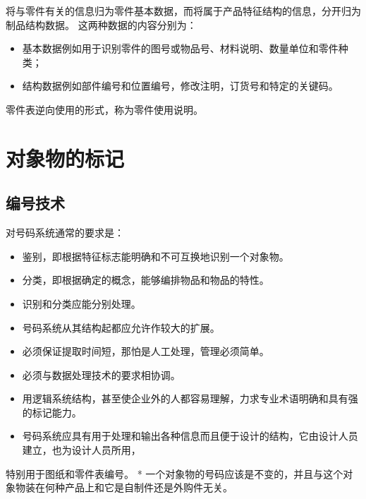 \documentclass[letterpaper,10pt,english]{sphinxmanual}
\begin{document}
将与零件有关的信息归为零件基本数据，而将属于产品特征结构的信息，分开归为制品结构数据。
这两种数据的内容分别为：
\begin{itemize}
\item {} 
基本数据例如用于识别零件的图号或物品号、材料说明、数量单位和零件种类；

\item {} 
结构数据例如部件编号和位置编号，修改注明，订货号和特定的关键码。

\end{itemize}

零件表逆向使用的形式，称为零件使用说明。


\section{对象物的标记}
\label{unit8:id7}

\subsection{编号技术}
\label{unit8:id8}
对号码系统通常的要求是：
\begin{itemize}
\item {} 
鉴别，即根据特征标志能明确和不可互换地识别一个对象物。

\item {} 
分类，即根据确定的概念，能够编排物品和物品的特性。

\item {} 
识别和分类应能分别处理。

\item {} 
号码系统从其结构起都应允许作较大的扩展。

\item {} 
必须保证提取时间短，那怕是人工处理，管理必须简单。

\item {} 
必须与数据处理技术的要求相协调。

\item {} 
用逻辑系统结构，甚至使企业外的人都容易理解，力求专业术语明确和具有强的标记能力。

\item {} 
号码系统应具有用于处理和输出各种信息而且便于设计的结构，它由设计人员建立，也为设计人员所用，

\end{itemize}

特别用于图纸和零件表编号。
* 一个对象物的号码应该是不变的，并且与这个对象物装在何种产品上和它是自制件还是外购件无关。
\end{document}
